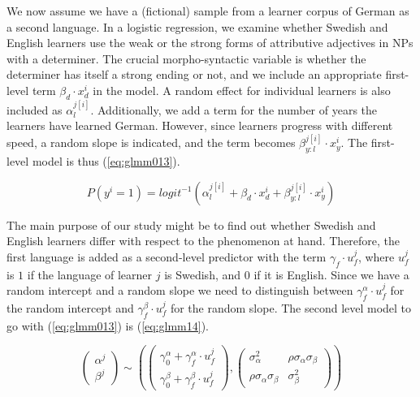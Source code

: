 \documentclass[a4paper,12pt]{article}
\begin{document}
We now assume we have a (fictional) sample from a learner corpus of German as a second language.
In a logistic regression, we examine whether Swedish and English learners use the weak or the strong forms of attributive adjectives in NPs with a determiner.
The crucial morpho-syntactic variable is whether the determiner has itself a strong ending or not, and we include an appropriate first-level term $\beta_d\cdot x_d^i$ in the model.
A random effect for individual learners is also included as $\alpha_l^{j[i]}$.
Additionally, we add a term for the number of years the learners have learned German.
However, since learners progress with different speed, a random slope is indicated, and the term becomes $\beta_{y:l}^{j[i]}\cdot x_y^i$.
The first-level model is thus (\ref{eq:glmm013}).

\begin{equation}
  P(y^i=1)=logit^{-1}(\alpha_l^{j[i]} + \beta_d\cdot x_d^i + \beta_{y:l}^{j[i]}\cdot x_y^i)
  \label{eq:glmm013}
\end{equation}

\pagebreak

The main purpose of our study might be to find out whether Swedish and English learners differ with respect to the phenomenon at hand.
Therefore, the first language is added as a second-level predictor with the term $\gamma_f\cdot u_f^j$, where $u_f^j$ is $1$ if the language of learner $j$ is Swedish, and $0$ if it is English.
Since we have a random intercept and a random slope we need to distinguish between $\gamma_f^{\alpha}\cdot u_f^j$ for the random intercept and $\gamma_f^{\beta}\cdot u_f^j$ for the random slope.
The second level model to go with (\ref{eq:glmm013}) is (\ref{eq:glmm14}).

\begin{equation} 
  \left( \begin{smallmatrix} \alpha^j \\ \beta^j \end{smallmatrix}\right) \sim
    \left(
    \left( \begin{smallmatrix} \gamma_0^{\alpha}+\gamma_f^{\alpha}\cdot u_f^j \\ \gamma_0^{\beta}+\gamma_f^{\beta}\cdot u_f^j    \end{smallmatrix} \right), 
      \left( \begin{smallmatrix} \sigma_{\alpha}^2 & \rho\sigma_{\alpha}\sigma_{\beta} \\
	\rho\sigma_{\alpha}\sigma_{\beta} & \sigma_{\beta}^2 \end{smallmatrix} \right)
    \right)
  \label{eq:glmm14}
\end{equation}
\end{document}
